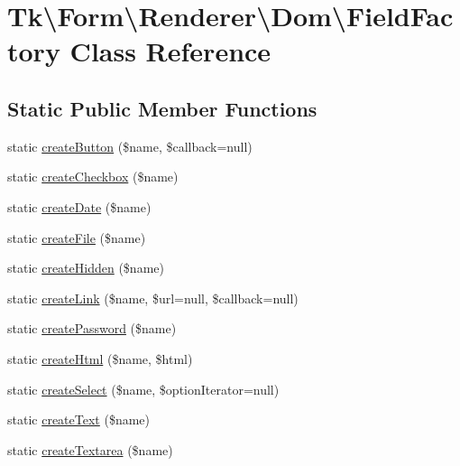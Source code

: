 \hypertarget{classTk_1_1Form_1_1Renderer_1_1Dom_1_1FieldFactory}{\section{Tk\textbackslash{}Form\textbackslash{}Renderer\textbackslash{}Dom\textbackslash{}Field\+Factory Class Reference}
\label{classTk_1_1Form_1_1Renderer_1_1Dom_1_1FieldFactory}
}
\subsection*{Static Public Member Functions}
\begin{DoxyCompactItemize}
\item 
static \hyperlink{classTk_1_1Form_1_1Renderer_1_1Dom_1_1FieldFactory_af040360732a6f718cb37c5d553e8b75a}{create\+Button} (\$name, \$callback=null)
\item 
static \hyperlink{classTk_1_1Form_1_1Renderer_1_1Dom_1_1FieldFactory_a844ded032cbf88dcf38dbbc57eb4296d}{create\+Checkbox} (\$name)
\item 
static \hyperlink{classTk_1_1Form_1_1Renderer_1_1Dom_1_1FieldFactory_a560d4e66e5a12116661b33f907e1f9cb}{create\+Date} (\$name)
\item 
static \hyperlink{classTk_1_1Form_1_1Renderer_1_1Dom_1_1FieldFactory_ac1f64af89135b5536c4d309cb7b20afc}{create\+File} (\$name)
\item 
static \hyperlink{classTk_1_1Form_1_1Renderer_1_1Dom_1_1FieldFactory_a71c0395cf1a28816c2723c34110a3d7c}{create\+Hidden} (\$name)
\item 
static \hyperlink{classTk_1_1Form_1_1Renderer_1_1Dom_1_1FieldFactory_a75aee22954c35e5871ba83cd2148a80a}{create\+Link} (\$name, \$url=null, \$callback=null)
\item 
static \hyperlink{classTk_1_1Form_1_1Renderer_1_1Dom_1_1FieldFactory_ac6f6223672fb99dfa38afb38878549c4}{create\+Password} (\$name)
\item 
static \hyperlink{classTk_1_1Form_1_1Renderer_1_1Dom_1_1FieldFactory_a87f8523f33dfa1d16d0228792633ba72}{create\+Html} (\$name, \$html)
\item 
static \hyperlink{classTk_1_1Form_1_1Renderer_1_1Dom_1_1FieldFactory_a3b86a7173ff38a4771ef87b9b66c1b20}{create\+Select} (\$name, \$option\+Iterator=null)
\item 
static \hyperlink{classTk_1_1Form_1_1Renderer_1_1Dom_1_1FieldFactory_a8ada246d469ffb310bcd01ca365c5b30}{create\+Text} (\$name)
\item 
static \hyperlink{classTk_1_1Form_1_1Renderer_1_1Dom_1_1FieldFactory_aaf153174eee3f6deadefe6e7ba539b7e}{create\+Textarea} (\$name)
\end{DoxyCompactItemize}


